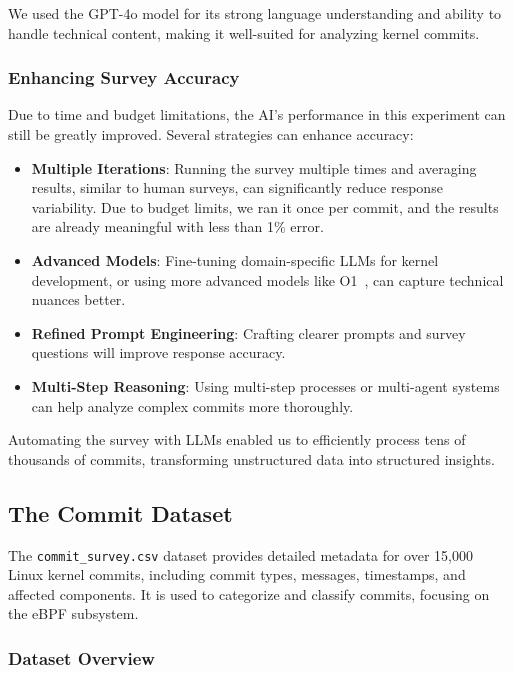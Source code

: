 We used the GPT-4o model for its strong language understanding and ability to handle technical content, making it well-suited for analyzing kernel commits.

\subsubsection{Enhancing Survey Accuracy}

Due to time and budget limitations, the AI's performance in this experiment can still be greatly improved. Several strategies can enhance accuracy:

\begin{itemize}
\item \textbf{Multiple Iterations}: Running the survey multiple times and averaging results, similar to human surveys, can significantly reduce response variability. Due to budget limits, we ran it once per commit, and the results are already meaningful with less than 1\% error.
\item \textbf{Advanced Models}: Fine-tuning domain-specific LLMs for kernel development, or using more advanced models like O1~\cite{o1}, can capture technical nuances better.
\item \textbf{Refined Prompt Engineering}: Crafting clearer prompts and survey questions will improve response accuracy.
\item \textbf{Multi-Step Reasoning}: Using multi-step processes or multi-agent systems can help analyze complex commits more thoroughly.
\end{itemize}

Automating the survey with LLMs enabled us to efficiently process tens of thousands of commits, transforming unstructured data into structured insights.

\subsection{The Commit Dataset}

The \texttt{commit\_survey.csv} dataset provides detailed metadata for over 15,000 Linux kernel commits, including commit types, messages, timestamps, and affected components. It is used to categorize and classify commits, focusing on the eBPF subsystem.

\subsubsection{Dataset Overview}


